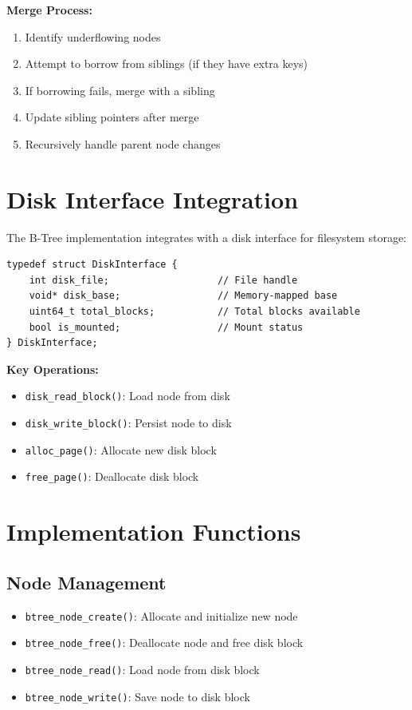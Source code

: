 \documentclass[12pt,a4paper]{article}
\begin{document}
\textbf{Merge Process:}
\begin{enumerate}
    \item Identify underflowing nodes
    \item Attempt to borrow from siblings (if they have extra keys)
    \item If borrowing fails, merge with a sibling
    \item Update sibling pointers after merge
    \item Recursively handle parent node changes
\end{enumerate}

\section{Disk Interface Integration}

The B-Tree implementation integrates with a disk interface for filesystem storage:

\begin{lstlisting}
typedef struct DiskInterface {
    int disk_file;                   // File handle
    void* disk_base;                 // Memory-mapped base
    uint64_t total_blocks;           // Total blocks available
    bool is_mounted;                 // Mount status
} DiskInterface;
\end{lstlisting}

\textbf{Key Operations:}
\begin{itemize}
    \item \texttt{disk\_read\_block()}: Load node from disk
    \item \texttt{disk\_write\_block()}: Persist node to disk
    \item \texttt{alloc\_page()}: Allocate new disk block
    \item \texttt{free\_page()}: Deallocate disk block
\end{itemize}

\section{Implementation Functions}

\subsection{Node Management}
\begin{itemize}
    \item \texttt{btree\_node\_create()}: Allocate and initialize new node
    \item \texttt{btree\_node\_free()}: Deallocate node and free disk block
    \item \texttt{btree\_node\_read()}: Load node from disk block
    \item \texttt{btree\_node\_write()}: Save node to disk block
\end{itemize}
\end{document}

